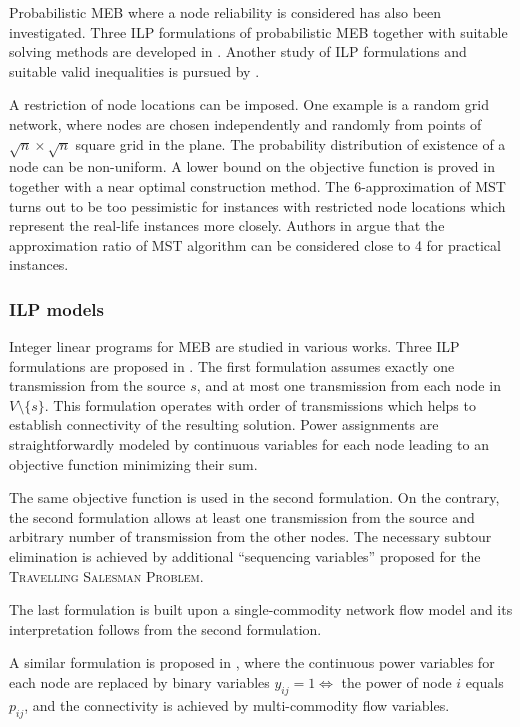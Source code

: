 Probabilistic MEB where a node reliability is considered has also been investigated.
Three ILP formulations of probabilistic MEB together with suitable solving methods are developed in \cite{montemanni08}.
Another study of ILP formulations and suitable valid inequalities is pursued by \cite{barta10}.

A restriction of node locations can be imposed.
One example is a random grid network, where nodes are chosen independently and randomly from points of $\sqrt{n}\times\sqrt{n}$ square grid in the plane.
The probability distribution of existence of a node can be non-uniform.
A lower bound on the objective function is proved in \cite{calamoneri08} together with a near optimal construction method.
The 6-approximation of MST turns out to be too pessimistic for instances with restricted node locations which represent the real-life instances more closely.
Authors in \cite{flammini07} argue that the approximation ratio of MST algorithm can be considered close to 4 for practical instances.

\subsubsection{ILP models}

Integer linear programs for MEB are studied in various works.
Three ILP formulations are proposed in \cite{das03}.
The first formulation assumes exactly one transmission from the source $s$, and at most one transmission from each node in $V\setminus\{s\}$.
This formulation operates with order of transmissions which helps to establish connectivity of the resulting solution.
Power assignments are straightforwardly modeled by continuous variables for each node leading to an objective function minimizing their sum.

The same objective function is used in the second formulation.
On the contrary, the second formulation allows at least one transmission from the source and arbitrary number of transmission from the other nodes.
The necessary subtour elimination is achieved by additional ``sequencing variables'' proposed for the \textsc{Travelling Salesman Problem}.

The last formulation is built upon a single-commodity network flow model and its interpretation follows from the second formulation.

A similar formulation is proposed in \cite{yuan05}, where the continuous power variables for each node are replaced by binary variables $y_{ij}=1\Leftrightarrow$ the power of node $i$ equals $p_{ij}$,
and the connectivity is achieved by multi-commodity flow variables.

